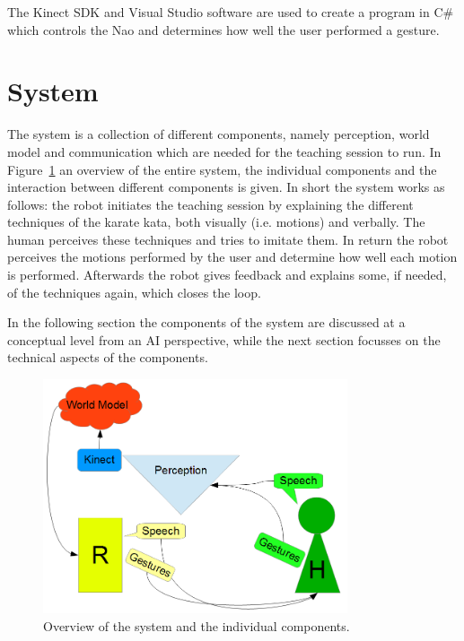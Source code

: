 \documentclass[10pt,a4paper,oneside]{scrartcl}
\begin{document}
The Kinect SDK and Visual Studio software are used to create a program in C\# which controls the Nao and determines how well the user performed a gesture. 

\section{System}
\label{sec:system}
The system is a collection of different components, namely perception, world model and communication which are needed for the teaching session to run.
In Figure~\ref{fig:system} an overview of the entire system, the individual components and the interaction between different components is given.
In short the system works as follows: the robot initiates the teaching session by explaining the different techniques of the karate kata, both visually (i.e. motions) and verbally.
The human perceives these techniques and tries to imitate them.
In return the robot perceives the motions performed by the user and determine  how well each motion is performed.
Afterwards the robot gives feedback and explains some, if needed, of the techniques again, which closes the loop.

In the following section the components of the system are discussed at a conceptual level from an AI perspective, while the next section focusses on the technical aspects of the components.

\begin{figure}[!ht]
	\centering
	\includegraphics[width=0.8\textwidth]{images/system.png}
	\caption{Overview of the system and the individual components.}
	\label{fig:system}
\end{figure}
\end{document}
